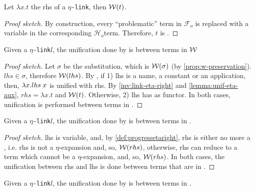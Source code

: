 \documentclass[sigconf,natbib=false,review]{acmart}
\newcommand{\appsep}{\ensuremath{\textcolor{lightgray}{\cdot}}}
\newcommand{\linkMacro}[1]{\ensuremath{#1}\texttt{-link}\xspace}
\newcommand{\linketa} {\linkMacro{\eta}}
\newcommand{\Fo}{\texorpdfstring{\ensuremath{\mathcal{F}_{\!o}\xspace}}{Fo}} %
\newcommand{\Ho}{\texorpdfstring{\ensuremath{\mathcal{H}_o}\xspace}{Ho}}
\newcommand{\lhs}{lhs\xspace}
\newcommand{\rhs}{rhs\xspace}
\begin{document}
\begin{lemma}
  Let $\lambda x.t$ the \rhs of a \linketa, then $\mathcal{W}(t)$.
  \label{lemma:unif-eta-aux}
\end{lemma}

\begin{proof}[Proof sketch]
  By construction, every ``problematic'' term in \Fo{} is replaced with a variable
  in the corresponding \Ho term. Therefore, $t$ is \wellb.
\end{proof}

\begin{lemma}
  Given a \linketa $l$, the unification done by \progressetaleft is between
  terms in $\mathcal{W}$  
  \label{lemma:unif-eta-1}
\end{lemma}

\begin{proof}[Proof sketch]
  Let $\sigma$ be the substitution, which is  $\mathcal{W}(\sigma)$ (by
  \cref{prop:w-preservation}). $\lhs \in \sigma$, therefore $\wellb(\lhs)$. By
  \progressetaleft, if 1) \lhs is a name, a constant or an
  application, then, $\lambda x.\lhs \appsep x$ is unified with \rhs. By
  \cref{inv:link-eta-right} and \cref{lemma:unif-eta-aux}, $\rhs = \lambda x. t$ and $\mathcal{W}(t)$.
  Otherwise, 2) \lhs has  as functor. In both cases, unification is
  performed between terms in \wellb.
\end{proof}

\begin{lemma}
  Given a \linketa $l$, the unification done by \progressetaright is between
  terms in \wellb.
  \label{lemma:unif-eta-2}
\end{lemma}

\begin{proof}[Proof sketch]
  \lhs is variable, and, by \cref{def:progressetaright}, \rhs is either no more
  a \maybeeta, i.e. \rhs is not a $\eta$-expansion and, so, $\wellb(\rhs)$,
  otherwise, \rhs can reduce to a term which cannot be a $\eta$-expansion, and,
  so, $\wellb(\rhs)$. In both cases, the unification between \rhs and \lhs
  is done between terms that are in \wellb.
\end{proof}

\begin{lemma}
  Given a \linketa $l$, the unification done by \progressetadedup is between
  terms in \wellb.
  \label{lemma:unif-eta-3}
\end{lemma}
\end{document}

